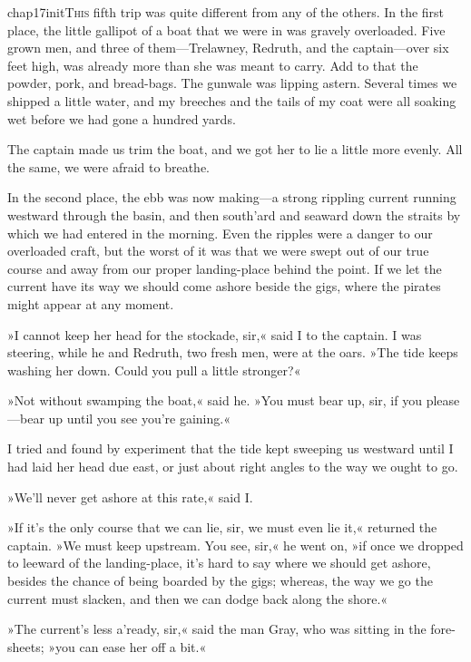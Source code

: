 
\lettrine[lines=5,image=true,findent=2pt]{chap17initT}{his} fifth trip was quite different from any of the others. In the first place, the little gallipot of a boat that we were in was gravely overloaded. Five grown men, and three of them—Trelawney, Redruth, and the captain—over six feet high, was already more than she was meant to carry. Add to that the powder, pork, and bread-bags. The gunwale was lipping astern. Several times we shipped a little water, and my breeches and the tails of my coat were all soaking wet before we had gone a hundred yards.

The captain made us trim the boat, and we got her to lie a little more evenly. All the same, we were afraid to breathe.

In the second place, the ebb was now making—a strong rippling current running westward through the basin, and then south'ard and seaward down the straits by which we had entered in the morning. Even the ripples were a danger to our overloaded craft, but the worst of it was that we were swept out of our true course and away from our proper landing-place behind the point. If we let the current have its way we should come ashore beside the gigs, where the pirates might appear at any moment.

»I cannot keep her head for the stockade, sir,« said I to the captain. I was steering, while he and Redruth, two fresh men, were at the oars. »The tide keeps washing her down. Could you pull a little stronger?«

»Not without swamping the boat,« said he. »You must bear up, sir, if you please—bear up until you see you're gaining.«

I tried and found by experiment that the tide kept sweeping us westward until I had laid her head due east, or just about right angles to the way we ought to go.

»We'll never get ashore at this rate,« said I.

»If it's the only course that we can lie, sir, we must even lie it,« returned the captain. »We must keep upstream. You see, sir,« he went on, »if once we dropped to leeward of the landing-place, it's hard to say where we should get ashore, besides the chance of being boarded by the gigs; whereas, the way we go the current must slacken, and then we can dodge back along the shore.«

»The current's less a'ready, sir,« said the man Gray, who was sitting in the fore-sheets; »you can ease her off a bit.«

